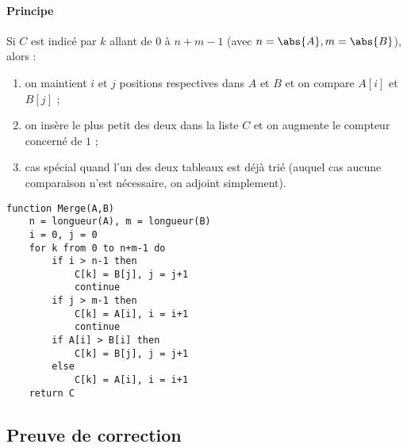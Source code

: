 \documentclass{mybourbaki}
\begin{document}
\paragraph{Principe}Si $C$ est indicé par $k$ allant de $0$ à $n+m-1$ (avec $n = \abs{A},m=\abs{B}$), alors :
\begin{enumerate}
\item on maintient $i$ et $j$ positions respectives dans $A$ et $B$ et on compare $A[i]$ et $B[j]$ ;
\item on insère le plus petit des deux dans la liste $C$ et on augmente le compteur concerné de $1$ ;
\item cas spécial quand l'un des deux tableaux est déjà trié (auquel cas aucune comparaison n'est nécessaire, on adjoint simplement).
\end{enumerate}

\begin{lstlisting}
function Merge(A,B)
	n = longueur(A), m = longueur(B)
	i = 0, j = 0
	for k from 0 to n+m-1 do
		if i > n-1 then
			C[k] = B[j], j = j+1
			continue
		if j > m-1 then
			C[k] = A[i], i = i+1
			continue
		if A[i] > B[i] then
			C[k] = B[j], j = j+1
		else
			C[k] = A[i], i = i+1
	return C					
\end{lstlisting}

\subsection{Preuve de correction}

\end{document}
